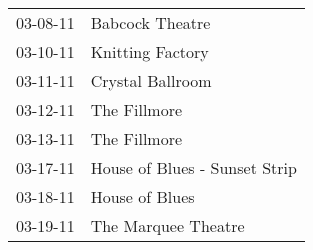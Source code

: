 \begin{supertabular}{p{0.25\columnwidth}p{0.75\columnwidth}}
 03-08-11 &                Babcock Theatre \\
 03-10-11 &               Knitting Factory \\
 03-11-11 &               Crystal Ballroom \\
 03-12-11 &                   The Fillmore \\
 03-13-11 &                   The Fillmore \\
 03-17-11 &  House of Blues - Sunset Strip \\
 03-18-11 &                 House of Blues \\
 03-19-11 &            The Marquee Theatre \\
\end{supertabular}
